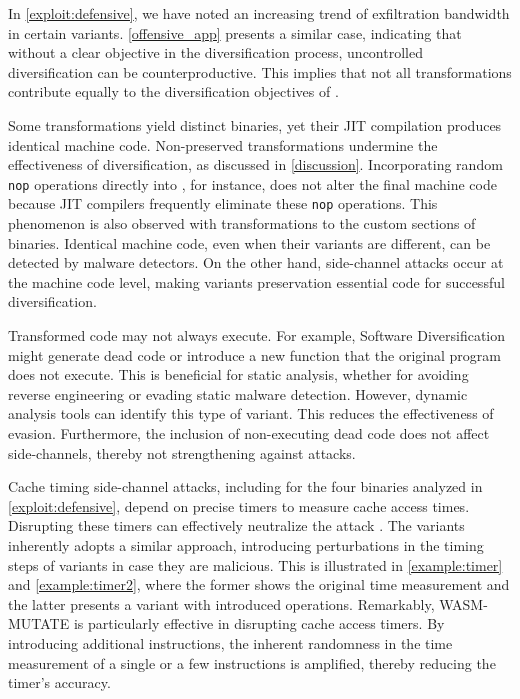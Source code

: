 \label{exploit:discussion}
In \autoref{exploit:defensive}, we have noted an increasing trend of exfiltration bandwidth in certain variants. 
\autoref{offensive_app} presents a similar case, indicating that without a clear objective in the diversification process, uncontrolled diversification can be counterproductive. 
This implies that not all transformations contribute equally to the diversification objectives of \Wasm.


Some transformations yield distinct \wasm binaries, yet their JIT compilation produces identical machine code.
Non-preserved transformations undermine the effectiveness of diversification, as discussed in \autoref{discussion}.
Incorporating random \texttt{nop} operations directly into \wasm, for instance, does not alter the final machine code because JIT compilers frequently eliminate these \texttt{nop} operations.
This phenomenon is also observed with transformations to the custom sections of \Wasm binaries.
Identical machine code, even when their \wasm variants are different, can be detected by malware detectors.
On the other hand, side-channel attacks occur at the machine code level, making \wasm variants preservation essential code for successful diversification.


Transformed code may not always execute. 
For example, Software Diversification might generate dead code or introduce a new function that the original program does not execute. 
This is beneficial for static analysis, whether for avoiding reverse engineering or evading static malware detection. 
However, dynamic analysis tools can identify this type of variant. 
This reduces the effectiveness of evasion. 
Furthermore, the inclusion of non-executing dead code does not affect side-channels, thereby not strengthening against attacks.
 
 Cache timing side-channel attacks, including for the four binaries analyzed in \autoref{exploit:defensive}, depend on precise timers to measure cache access times. 
Disrupting these timers can effectively neutralize the attack \cite{JStimers}. 
The \wasm variants inherently adopts a similar approach, introducing perturbations in the timing steps of \wasm variants in case they are malicious. 
This is illustrated in \autoref{example:timer} and \autoref{example:timer2}, where the former shows the original time measurement and the latter presents a variant with introduced operations.
Remarkably, WASM-MUTATE is particularly effective in disrupting cache access timers. 
By introducing additional instructions, the inherent randomness in the time measurement of a single or a few instructions is amplified, thereby reducing the timer's accuracy. 

